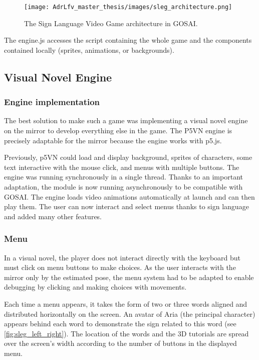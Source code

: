 \begin{figure}[h]
    \centering
    \texttt{[image: AdrLfv\_master\_thesis/images/sleg\_architecture.png]}
    \caption{The Sign Language Video Game architecture in GOSAI.}
    \label{fig:sleg_architecture}
\end{figure}

The engine.js accesses the script containing the whole game and the components contained locally (sprites, animations, or backgrounds).

\subsection{Visual Novel Engine}

\subsubsection{Engine implementation}

The best solution to make such a game was implementing a visual novel engine on the mirror to develop everything else in the game. The P5VN engine is precisely adaptable for the mirror because the engine works with p5.js.

Previously, p5VN could load and display background, sprites of characters, some text interactive with the mouse click, and menus with multiple buttons.
The engine was running synchronously in a single thread.
Thanks to an important adaptation, the module is now running asynchronously to be compatible with GOSAI. 
The engine loads video animations automatically at launch and can then play them. The user can now interact and select menus thanks to sign language and added many other features.

\subsubsection{Menu}

In a visual novel, the player does not interact directly with the keyboard but must click on menu buttons to make choices. As the user interacts with the mirror only by the estimated pose, the menu system had to be adapted to enable debugging by clicking and making choices with movements.

Each time a menu appears, it takes the form of two or three words aligned and distributed horizontally on the screen. An avatar of Aria (the principal character) appears behind each word to demonstrate the sign related to this word (see \ref{fig:sleg_left_right}). The location of the words and the 3D tutorials are spread over the screen's width according to the number of buttons in the displayed menu. 

